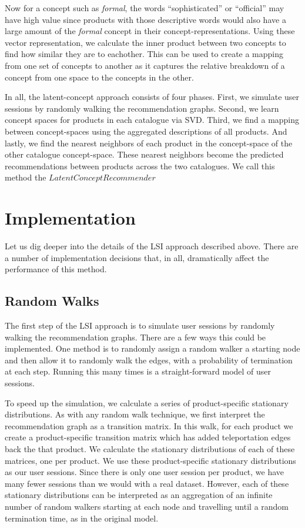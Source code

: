 \documentclass[11pt]{article}
\begin{document}
Now for a concept such as {\em formal}, the words ``sophisticated'' or
``official'' may have high value since products with those descriptive words
would also have a large amount of the {\em formal} concept in their
concept-representations. Using these vector representation, we calculate the
inner product between two concepts to find how similar they are to eachother.
This can be used to create a mapping from one set of concepts to another as it
captures the relative breakdown of a concept from one space to the concepts in
the other.

In all, the latent-concept approach consists of four phases. First, we simulate
user sessions by randomly walking the recommendation graphs. Second, we learn
concept spaces for products in each catalogue via SVD. Third, we find a mapping
between concept-spaces using the aggregated descriptions of all products. And
lastly, we find the nearest neighbors of each product in the concept-space of
the other catalogue concept-space. These nearest neighbors become the predicted
recommendations between products across the two catalogues. We call this method
the $LatentConceptRecommender$

\section*{Implementation}
Let us dig deeper into the details of the LSI approach described above. There 
are a number of implementation decisions that, in all, dramatically affect the
performance of this method.

\subsection*{Random Walks}
The first step of the LSI approach is to simulate user sessions by randomly
walking the recommendation graphs. There are a few ways this could be
implemented.  One method is to randomly assign a random walker a starting node
and then allow it to randomly walk the edges, with a probability of termination
at each step.  Running this many times is a straight-forward model of user
sessions.

To speed up the simulation, we calculate a series of product-specific stationary
distributions. As with any random walk technique, we first interpret the
recommendation graph as a transition matrix. In this walk, for each product we
create a product-specific transition matrix which has added teleportation edges
back the that product. We calculate the stationary distributions of each of
these matrices, one per product. We use these product-specific stationary
distributions as our user sessions. Since there is only one user session per
product, we have many fewer sessions than we would with a real dataset. However,
each of these stationary distributions can be interpreted as an aggregation of
an infinite number of random walkers starting at each node and travelling until
a random termination time, as in the original model.
\end{document}
